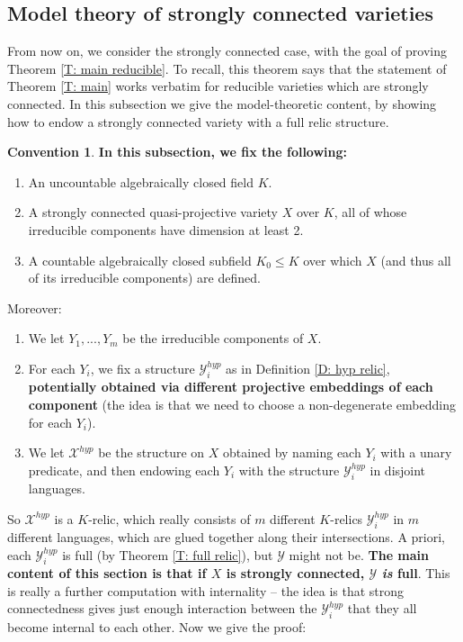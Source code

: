 \documentclass{amsart}
\theoremstyle{definition}
\newtheorem{convention}[theorem]{Convention}
\begin{document}
\subsection{Model theory of strongly connected varieties}

From now on, we consider the strongly connected case, with the goal of proving Theorem \ref{T: main reducible}. To recall, this theorem says that the statement of Theorem \ref{T: main} works verbatim for reducible varieties which are strongly connected. In this subsection we give the model-theoretic content, by showing how to endow a strongly connected variety with a full relic structure.

\begin{convention}\label{Con: reducible full} \textbf{In this subsection, we fix the following:}
\begin{enumerate}
    \item An uncountable algebraically closed field $K$.
    \item A strongly connected quasi-projective variety $X$ over $K$, all of whose irreducible components have dimension at least 2.
    \item A countable algebraically closed subfield $K_0\leq K$ over which $X$ (and thus all of its irreducible components) are defined.
\end{enumerate}
    Moreover:
    \begin{enumerate}
        \item[(a)] We let $Y_1,...,Y_m$ be the irreducible components of $X$.
        \item[(b)] For each $Y_i$, we fix a structure $\mathcal Y_i^{hyp}$ as in Definition \ref{D: hyp relic}, \textbf{potentially obtained via different projective embeddings of each component} (the idea is that we need to choose a non-degenerate embedding for each $Y_i$).
        \item[(c)] We let $\mathcal X^{hyp}$ be the structure on $X$ obtained by naming each $Y_i$ with a unary predicate, and then endowing each $Y_i$ with the structure $\mathcal Y_i^{hyp}$ in disjoint languages.
    \end{enumerate}
\end{convention}

So $\mathcal X^{hyp}$ is a $K$-relic, which really consists of $m$ different $K$-relics $\mathcal Y_i^{hyp}$ in $m$ different languages, which are glued together along their intersections. A priori, each $\mathcal Y_i^{hyp}$ is full (by Theorem \ref{T: full relic}), but $\mathcal Y$ might not be. \textbf{The main content of this section is that if $X$ is strongly connected, $\mathcal Y$ \textit{is} full}. This is really a further computation with internality -- the idea is that strong connectedness gives just enough interaction between the $\mathcal Y_i^{hyp}$ that they all become internal to each other. Now we give the proof:
\end{document}
